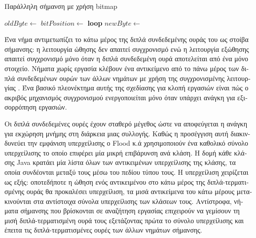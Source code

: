 \begin{greek}
\begin{algorithm}
  \caption{Παράλληλη σήμανση με χρήση bitmap}
  \label{alg:par2}
  \begin{algorithmic}[1]
      \State $oldByte \gets$ 
      \State $bitPosition \gets$ 
      \State \textbf{loop}
      \Loop
          \State \Return{\null}
        \EndIf
        \State $newByte \gets$ 
          \State \Return{\null}
        \EndIf
      \EndLoop
    \EndProcedure
  \end{algorithmic}
\end{algorithm}

Ένα νήμα αντιμετωπίζει το κάτω μέρος της διπλά συνδεδεμένης ουράς
του ως στοίβα σήμανσης: η λειτουργία ώθησης δεν απαιτεί συγχρονισμό
ενώ η λειτουργία εξώθησης απαιτεί συγχρονισμό μόνο όταν η διπλά
συνδεδεμένη ουρά αποτελείται από ένα μόνο στοιχείο. Νήματα χωρίς
εργασία κλέβουν ένα αντικείμενο από το πάνω μέρος των διπλά συνδεδεμένων
ουρών των άλλων νημάτων με χρήση της συγχρονισμένης λειτουργίας
. Ένα βασικό πλεονέκτημα αυτής της σχεδίασης
για κλοπή εργασιών είναι πώς ο ακριβός μηχανισμός συγχρονισμού
ενεργοποιείται μόνο όταν υπάρχει ανάγκη για εξισορρόπηση εργασιών.

Οι διπλά συνδεδεμένες ουρές έχουν σταθερό μέγεθος ώστε να αποφεύγεται
η ανάγκη για εκχώρηση μνήμης στη διάρκεια μιας συλλογής. Καθώς
η προσέγγιση αυτή διακινδυνεύει την εμφάνιση υπερχείλισης ο
Flood κ.ά χρησιμοποιούν ένα καθολικό σύνολο υπερχείλισης το
οποίο επιφέρει μία μικρή επιβάρυνση ανά κλάση. Η δομή κάθε
κλάσης Java κρατάει μία λίστα όλων των αντικειμένων υπερχείλισης
της κλάσης, τα οποία συνδέονται μεταξύ τους μέσω του πεδίου
τύπου τους. Η υπερχείλιση χειρίζεται ως εξής: οποτεδήποτε η
ώθηση ενός αντικειμένου στο κάτω μέρος της διπλά-τερματισμένης
ουράς θα προκαλέσει υπερχείλιση, τα μισά αντικείμενα του κάτω
μέρους μετακινούνται στα αντίστοιχα σύνολα υπερχείλισης των
κλάσεων τους. Αντίστροφα, νήματα σήμανσης που βρίσκονται σε
αναζήτηση εργασίας επιχειρούν να γεμίσουν τη μισή διπλά-τερματισμένη
ουρά τους εξετάζοντας πρώτα το σύνολο υπερχείλισης και έπειτα
τις διπλά-τερματισμένες ουρές των άλλων νημάτων σήμανσης.


\end{greek}
